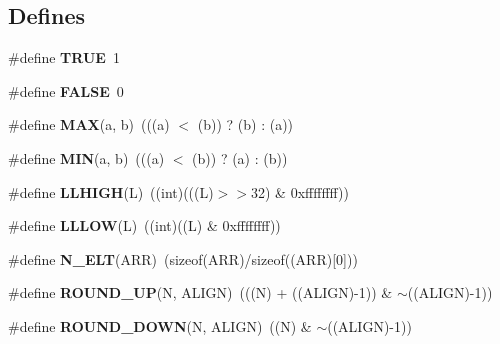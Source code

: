 \subsection*{Defines}
\begin{CompactItemize}
\item 
\#define {\bf TRUE}~1
\item 
\#define {\bf FALSE}~0
\item 
\#define {\bf MAX}(a, b)~(((a) $<$ (b)) ? (b) : (a))
\item 
\#define {\bf MIN}(a, b)~(((a) $<$ (b)) ? (a) : (b))
\item 
\#define {\bf LLHIGH}(L)~((int)(((L)$>$$>$32) \& 0xffffffff))
\item 
\#define {\bf LLLOW}(L)~((int)((L) \& 0xffffffff))
\item 
\#define {\bf N\_\-ELT}(ARR)~(sizeof(ARR)/sizeof((ARR)[0]))
\item 
\#define {\bf ROUND\_\-UP}(N, ALIGN)~(((N) + ((ALIGN)-1)) \& $\sim$((ALIGN)-1))
\item 
\#define {\bf ROUND\_\-DOWN}(N, ALIGN)~((N) \& $\sim$((ALIGN)-1))
\end{CompactItemize}
